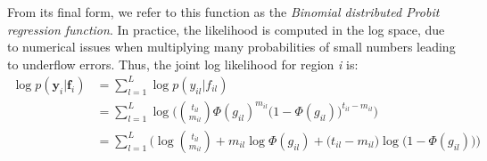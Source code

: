 From its final form, we refer to this function as the \emph{Binomial distributed Probit regression function}. In practice, the likelihood is computed in the log space, due to numerical issues when multiplying many probabilities of small numbers leading to underflow errors. Thus, the joint log likelihood for region \emph{i} is:
\begin{equation} \label{likel-binom-prob-log-f-meth}
  \begin{split}
	\log p(\mathbf{y}_{i}|\mathbf{f}_{i}) & = \sum_{l=1}^{L} \log p(y_{il}|f_{il}) \\
				& = \sum_{l=1}^{L} \log \bigg(\binom{t_{il}}{m_{il}} \Phi(g_{il})^{m_{il}} \big(1 - \Phi(g_{il})\big)^{t_{il} - m_{il}}\bigg) \\
				& = \sum_{l=1}^{L} \bigg(\log \binom{t_{il}}{m_{il}} + m_{il} \log \Phi(g_{il}) + \big(t_{il} - m_{il} \big) \log \big(1 - \Phi(g_{il})\big)\bigg)
  \end{split}
\end{equation}